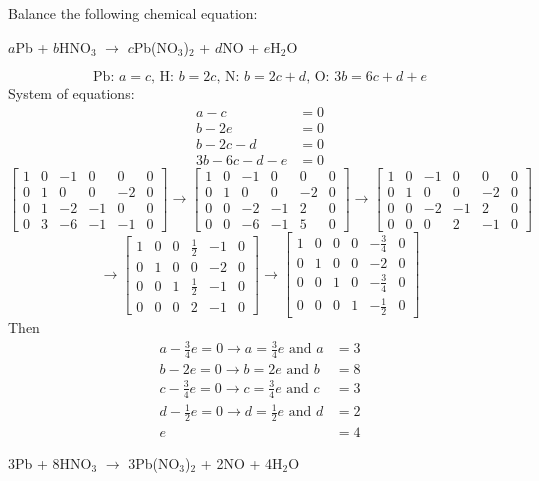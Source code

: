 \documentclass[12pt]{article}
\begin{document}
\begin{example} Balance the following chemical equation: \newline \begin{center} $a$Pb + $b$HNO$_3$ $\rightarrow$ $c$Pb(NO$_3$)$_2$ + $d$NO + $e$H$_2$O \end{center}  
$$ \text{Pb: }a = c\text{, H: }b = 2c\text{, N: }b = 2c + d\text{, O: }3b = 6c + d + e $$ \newline
System of equations: $$ \begin{aligned} a - c &= 0 \\ b - 2e &= 0 \\ b - 2c - d &= 0 \\ 3b - 6c - d - e &= 0 \end{aligned} $$
$$ \begin{bmatrix}
1 & 0 & -1 & 0 & 0 & 0 \\ 0 & 1 & 0 & 0 & -2 & 0 \\ 0 & 1 & -2 & -1 & 0 & 0 \\ 0 & 3 & -6 & -1 & -1 & 0 
\end{bmatrix} \rightarrow 
 \begin{bmatrix}
1 & 0 & -1 & 0 & 0 & 0 \\ 0 & 1 & 0 & 0 & -2 & 0 \\ 0 & 0 & -2 & -1 & 2 & 0 \\ 0 & 0 & -6 & -1 & 5 & 0 
\end{bmatrix} \rightarrow 
 \begin{bmatrix}
1 & 0 & -1 & 0 & 0 & 0 \\ 0 & 1 & 0 & 0 & -2 & 0 \\ 0 & 0 & -2 & -1 & 2 & 0 \\ 0 & 0 & 0 & 2 & -1 & 0 
\end{bmatrix} $$ $$\rightarrow 
\begin{bmatrix}
1 & 0 & 0 & \frac{1}{2} & -1 & 0 \\ 0 & 1 & 0 & 0 & -2 & 0 \\ 0 & 0 & 1 & \frac{1}{2} & -1 & 0 \\ 0 & 0 & 0 & 2 & -1 & 0
\end{bmatrix} \rightarrow 
 \begin{bmatrix}
1 & 0 & 0 & 0 & -\frac{3}{4} & 0 \\ 0 & 1 & 0 & 0 & -2 & 0 \\ 0 & 0 & 1 & 0 & -\frac{3}{4} & 0 \\ 0 & 0 & 0 & 1 & -\frac{1}{2} & 0
\end{bmatrix} $$ 
Then $$ \begin{aligned} a - \frac{3}{4}e = 0 \rightarrow a = \frac{3}{4}e \text{ and } a &= 3 \\ b - 2e = 0 \rightarrow b = 2e \text{ and } b &= 8 \\ c - \frac{3}{4}e = 0 \rightarrow c = \frac{3}{4}e \text { and } c &= 3 \\ d - \frac{1}{2}e = 0 \rightarrow d = \frac{1}{2}e \text{ and } d &= 2 \\ e &= 4 \end{aligned} $$ 
\begin{center} 3Pb + 8HNO$_3$ $\rightarrow$ 3Pb(NO$_3$)$_2$ + 2NO + 4H$_2$O \end{center} \end{example}
\end{document}
